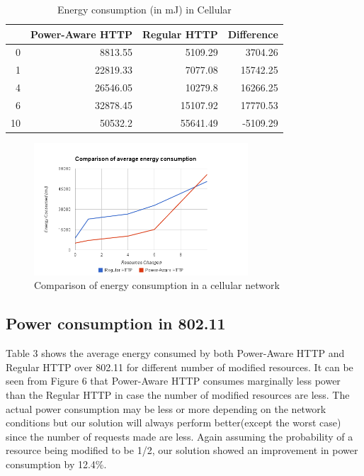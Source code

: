 \documentclass{sigplanconf}
\begin{document}
\begin{table}[htbp]
\centering
\caption{Energy consumption (in mJ) in Cellular}
\begin{tabular}{|r|r|r|r|}
\hline
\multicolumn{1}{|l|}{} & \multicolumn{1}{l|}{Power-Aware HTTP} & \multicolumn{1}{l|}{Regular HTTP} & \multicolumn{1}{l|}{Difference} \\ \hline
0 & 8813.55 & 5109.29 & 3704.26 \\ \hline
1 & 22819.33 & 7077.08 & 15742.25 \\ \hline
4 & 26546.05 & 10279.8 & 16266.25 \\ \hline
6 & 32878.45 & 15107.92 & 17770.53 \\ \hline
10 & 50532.2 & 55641.49 & -5109.29 \\ \hline
\end{tabular}
\label{}
\end{table}

\begin{figure}[ht!]
\centering
\includegraphics[width=80mm]{avg_energy_cell.png}
\caption{Comparison of energy consumption in a cellular network}
\label{fig:sp_gd_mnist}
\end{figure}

\subsection{Power consumption in 802.11}
Table 3 shows the average energy consumed by both Power-Aware HTTP and Regular HTTP over 802.11 for different number of modified resources. It can be seen from Figure 6 that Power-Aware HTTP consumes marginally less power than the Regular HTTP in case the number of modified resources are less. The actual power consumption may be less or more depending on the network conditions but our solution will always perform better(except the worst case) since the number of requests made are less. Again assuming the probability of a resource being modified to be 1/2, our solution showed an improvement in power consumption by 12.4\%.
\end{document}
